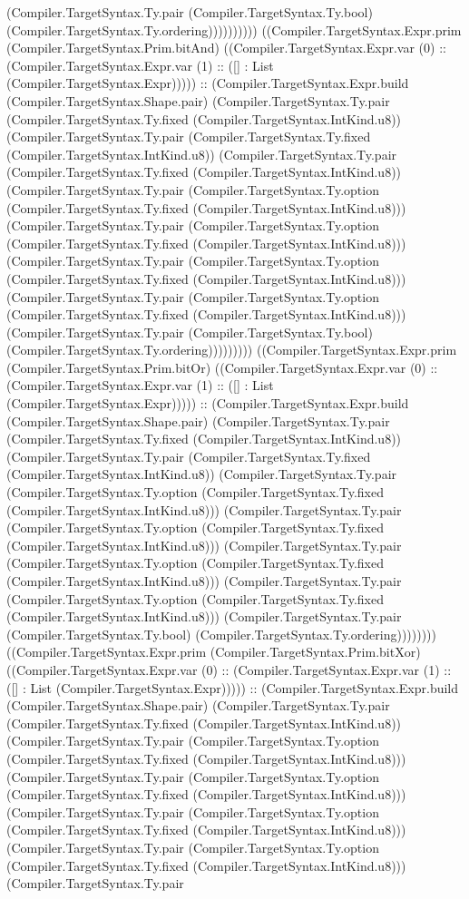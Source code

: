 \documentclass[11pt]{article}
\begin{document}
(Compiler.TargetSyntax.Ty.pair (Compiler.TargetSyntax.Ty.bool) (Compiler.TargetSyntax.Ty.ordering)))))))))) ((Compiler.TargetSyntax.Expr.prim (Compiler.TargetSyntax.Prim.bitAnd) ((Compiler.TargetSyntax.Expr.var (0) :: (Compiler.TargetSyntax.Expr.var (1) :: ([] : List (Compiler.TargetSyntax.Expr))))) :: (Compiler.TargetSyntax.Expr.build (Compiler.TargetSyntax.Shape.pair) (Compiler.TargetSyntax.Ty.pair (Compiler.TargetSyntax.Ty.fixed (Compiler.TargetSyntax.IntKind.u8)) (Compiler.TargetSyntax.Ty.pair (Compiler.TargetSyntax.Ty.fixed (Compiler.TargetSyntax.IntKind.u8)) (Compiler.TargetSyntax.Ty.pair (Compiler.TargetSyntax.Ty.fixed (Compiler.TargetSyntax.IntKind.u8)) (Compiler.TargetSyntax.Ty.pair (Compiler.TargetSyntax.Ty.option (Compiler.TargetSyntax.Ty.fixed (Compiler.TargetSyntax.IntKind.u8))) (Compiler.TargetSyntax.Ty.pair (Compiler.TargetSyntax.Ty.option (Compiler.TargetSyntax.Ty.fixed (Compiler.TargetSyntax.IntKind.u8))) (Compiler.TargetSyntax.Ty.pair (Compiler.TargetSyntax.Ty.option (Compiler.TargetSyntax.Ty.fixed (Compiler.TargetSyntax.IntKind.u8))) (Compiler.TargetSyntax.Ty.pair (Compiler.TargetSyntax.Ty.option (Compiler.TargetSyntax.Ty.fixed (Compiler.TargetSyntax.IntKind.u8))) (Compiler.TargetSyntax.Ty.pair (Compiler.TargetSyntax.Ty.bool) (Compiler.TargetSyntax.Ty.ordering))))))))) ((Compiler.TargetSyntax.Expr.prim (Compiler.TargetSyntax.Prim.bitOr) ((Compiler.TargetSyntax.Expr.var (0) :: (Compiler.TargetSyntax.Expr.var (1) :: ([] : List (Compiler.TargetSyntax.Expr))))) :: (Compiler.TargetSyntax.Expr.build (Compiler.TargetSyntax.Shape.pair) (Compiler.TargetSyntax.Ty.pair (Compiler.TargetSyntax.Ty.fixed (Compiler.TargetSyntax.IntKind.u8)) (Compiler.TargetSyntax.Ty.pair (Compiler.TargetSyntax.Ty.fixed (Compiler.TargetSyntax.IntKind.u8)) (Compiler.TargetSyntax.Ty.pair (Compiler.TargetSyntax.Ty.option (Compiler.TargetSyntax.Ty.fixed (Compiler.TargetSyntax.IntKind.u8))) (Compiler.TargetSyntax.Ty.pair (Compiler.TargetSyntax.Ty.option (Compiler.TargetSyntax.Ty.fixed (Compiler.TargetSyntax.IntKind.u8))) (Compiler.TargetSyntax.Ty.pair (Compiler.TargetSyntax.Ty.option (Compiler.TargetSyntax.Ty.fixed (Compiler.TargetSyntax.IntKind.u8))) (Compiler.TargetSyntax.Ty.pair (Compiler.TargetSyntax.Ty.option (Compiler.TargetSyntax.Ty.fixed (Compiler.TargetSyntax.IntKind.u8))) (Compiler.TargetSyntax.Ty.pair (Compiler.TargetSyntax.Ty.bool) (Compiler.TargetSyntax.Ty.ordering)))))))) ((Compiler.TargetSyntax.Expr.prim (Compiler.TargetSyntax.Prim.bitXor) ((Compiler.TargetSyntax.Expr.var (0) :: (Compiler.TargetSyntax.Expr.var (1) :: ([] : List (Compiler.TargetSyntax.Expr))))) :: (Compiler.TargetSyntax.Expr.build (Compiler.TargetSyntax.Shape.pair) (Compiler.TargetSyntax.Ty.pair (Compiler.TargetSyntax.Ty.fixed (Compiler.TargetSyntax.IntKind.u8)) (Compiler.TargetSyntax.Ty.pair (Compiler.TargetSyntax.Ty.option (Compiler.TargetSyntax.Ty.fixed (Compiler.TargetSyntax.IntKind.u8))) (Compiler.TargetSyntax.Ty.pair (Compiler.TargetSyntax.Ty.option (Compiler.TargetSyntax.Ty.fixed (Compiler.TargetSyntax.IntKind.u8))) (Compiler.TargetSyntax.Ty.pair (Compiler.TargetSyntax.Ty.option (Compiler.TargetSyntax.Ty.fixed (Compiler.TargetSyntax.IntKind.u8))) (Compiler.TargetSyntax.Ty.pair (Compiler.TargetSyntax.Ty.option (Compiler.TargetSyntax.Ty.fixed (Compiler.TargetSyntax.IntKind.u8))) (Compiler.TargetSyntax.Ty.pair 
\end{document}
